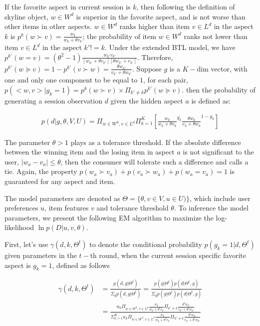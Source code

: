 \documentclass[sigconf]{acmart}
\begin{document}
If the favorite aspect in current session is $k$, then following the definition of skyline object, $w\in W^d$ is superior in the favorite aspect,  and is not worse than other items in other aspects. $w\in W^d$ ranks higher than item $v\in L^d$ in the aspect $k$ is $p^k(w \succ v)=\frac{w_k}{w_k+\theta v_k}$; the probability of item $w\in W^d$ ranks not lower than item $v\in L^d$ in the aspect $k'!=k$. Under the extended BTL model, we have$p^{k'}(w = v)=(\theta^2-1)\frac{w_{k'}v_{k'}}{[w_{k'}+\theta v_{k'}][\theta w_{k'}+ v_{k'}]}$. Therefore, $p^{k'}(w \succeq v)=1- p^{k'} (v \succ w) = \frac{\theta w_{k'}}{v_{k'}+\theta w_{k'}}$. Suppose $g$ is a $K-$dim vector, with one and only one component to be equal to $1$, for each pair, $p(<w,v>|g_k=1) = p^k(w\succ v) \times \Pi_{k'\neq k} p^{k'}(w \succeq v)$. then the probability of generating a session observation $d$ given the hidden aspect $a$ is defined as:  

\begin{align}\label{equ:skyline}
		p(d|g,\theta,V,U) %
		=\Pi_{w\in W^d, v\in L^d} \Pi_{k=1}^{K}[ {\frac{w_k}{w_k+\theta v_k}}^{g_k} { \frac{\theta w_{k}}{v_{k}+\theta w_{k}}}^{1-g_k}]
\end{align}

The parameter $\theta>1$ plays as a tolerance threshold. If the absolute difference between the winning item and the losing item in aspect $a$ is not significant to the user, $|w_a-v_a|\leq \theta$, then the consumer will tolerate such a difference and calls a tie. Again, the property $p(w_a \succ v_a) + p(v_a \succ w_a) + p( w_a = v_a) =1$ is guaranteed for any aspect and item.
 



The model parameters are denoted as $\Theta=\{\theta,v\in V, u\in U)\}$, which include user preferences $u$, item features $v$ and tolerance threshold $\theta$. To inference the model parameters, we present the following EM algorithm to maximize the log-likelihood $\ln p(D|u,v,\theta)$. 

First, let's use $\gamma(d,k,\Theta^t)$ to denote the conditional probability $p(g_k=1|d,\Theta^t)$ given parameters in the $t-$th round, when the current session specific favorite aspect is $g_k=1$, defined as follows

\begin{align}\label{equ:conditional}
\gamma(d,k,\Theta^t) &=\frac{p(d,g|\Theta^t)}{\Sigma_g p(d,g|\Theta^t)} = \frac{p(g|\Theta^t)p(d|\Theta^t,g)}{\Sigma_g p(g|\Theta^t)p(d|\Theta^t,g)}\\\nonumber
&=\frac{u_k \Pi_{w \in W^d, v\in L^d} \frac{w_k}{w_k+\theta^t v_k}\Pi_{k'\neq k}\frac{\theta^t w_{k'}}{v_{k'}+\theta^t w_{k'}}}{\Sigma_{k=1}^K u_k \Pi_{w \in W^d, v\in L^d} \frac{w_k}{w_k+\theta^t v_k}\Pi_{k'\neq k}\frac{\theta^t w_{k'}}{v_{k'}+\theta^t w_{k'}}}
\end{align}
\end{document}
